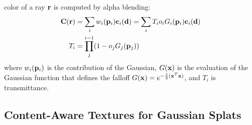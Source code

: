   color of a ray $\mathbf{r}$ is computed by alpha blending:
\begin{align}
    \mathbf{C(\mathbf{r})} &=  \sum_i w_i(\mathbf{p}_i)\mathbf{c}_i(\mathbf{d}) =  \sum_i T_i o_i G_i(\mathbf{p}_i)\mathbf{c}_i(\mathbf{d}) \\
    T_i &= \prod_j^{i-1} (1-o_jG_j(\mathbf{p}_j))
\end{align}
where $w_i(\mathbf{p}_i)$ is the contribution of the Gaussian, 
$G(\mathbf{x})$ is the evaluation of the Gaussian function that defines the falloff $G(\mathbf{x}) = e^{-\frac{1}{2}({\mathbf{x}^T\mathbf{x}})}$, and $T_i$ is transmittance.


\subsection{Content-Aware Textures for Gaussian Splats}

%



